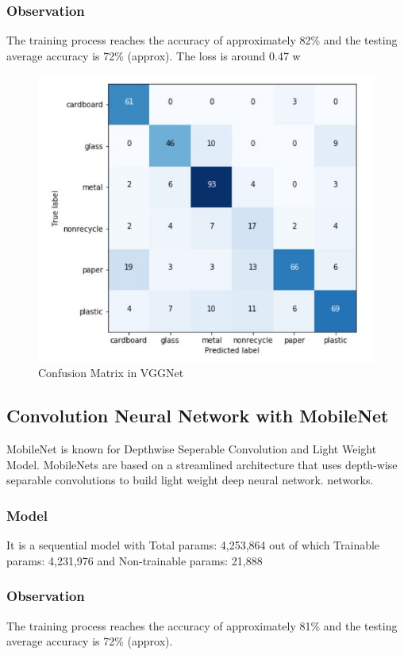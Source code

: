 \documentclass[10pt,twocolumn,letterpaper]{article}
\begin{document}
\subsubsection{Observation}
The training process reaches the accuracy of approximately 82\% and the testing average accuracy is 72\% (approx). The loss is around 0.47 w

\begin{figure}[h!]
    \centering
    \includegraphics[scale=0.4]{pic/VGGCM.JPG}
    \caption{Confusion Matrix in VGGNet}
    \label{fig:Confusion Matrix in VGGNet}
\end{figure}

\subsection{Convolution Neural Network with MobileNet}
MobileNet is known for Depthwise Seperable Convolution and Light Weight Model. MobileNets are based on a streamlined architecture that uses depth-wise separable convolutions to build light weight deep neural network. networks.\cite{MobileNet}
\subsubsection{Model}
It is a sequential model with Total params: 4,253,864 out of which Trainable params: 4,231,976 and Non-trainable params: 21,888

\subsubsection{Observation}
The training process reaches the accuracy of approximately 81\% and the testing average accuracy is 72\% (approx).
\end{document}
